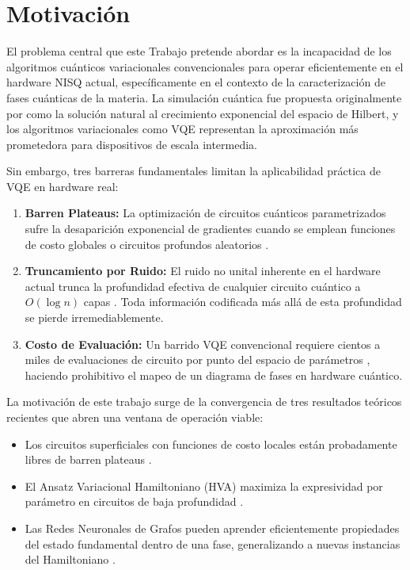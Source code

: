 \documentclass[11pt,a4paper,spanish]{book}
\begin{document}
\section{Motivación}

El problema central que este Trabajo pretende abordar es la incapacidad de los algoritmos cuánticos variacionales convencionales para operar eficientemente en el hardware NISQ actual, específicamente en el contexto de la caracterización de fases cuánticas de la materia. La simulación cuántica fue propuesta originalmente por \citet{feynman1982} como la solución natural al crecimiento exponencial del espacio de Hilbert, y los algoritmos variacionales como VQE \citep{peruzzo2014} representan la aproximación más prometedora para dispositivos de escala intermedia.

Sin embargo, tres barreras fundamentales limitan la aplicabilidad práctica de VQE en hardware real:

\begin{enumerate}
    \item \textbf{Barren Plateaus:} La optimización de circuitos cuánticos parametrizados sufre la desaparición exponencial de gradientes cuando se emplean funciones de costo globales o circuitos profundos aleatorios \citep{mcclean2018, cerezo2021}.

    \item \textbf{Truncamiento por Ruido:} El ruido no unital inherente en el hardware actual trunca la profundidad efectiva de cualquier circuito cuántico a $O(\log n)$ capas \citep{mele2026}. Toda información codificada más allá de esta profundidad se pierde irremediablemente.

    \item \textbf{Costo de Evaluación:} Un barrido VQE convencional requiere cientos a miles de evaluaciones de circuito por punto del espacio de parámetros \citep{tilly2022}, haciendo prohibitivo el mapeo de un diagrama de fases en hardware cuántico.
\end{enumerate}

La motivación de este trabajo surge de la convergencia de tres resultados teóricos recientes que abren una ventana de operación viable:

\begin{itemize}
    \item Los circuitos superficiales con funciones de costo locales están probadamente libres de barren plateaus \citep{cerezo2021, mele2026}.
    \item El Ansatz Variacional Hamiltoniano (HVA) maximiza la expresividad por parámetro en circuitos de baja profundidad \citep{wiersema2020}.
    \item Las Redes Neuronales de Grafos pueden aprender eficientemente propiedades del estado fundamental dentro de una fase, generalizando a nuevas instancias del Hamiltoniano \citep{huang2022}.
\end{itemize}
\end{document}
